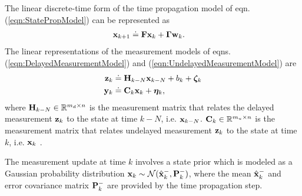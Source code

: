 The linear discrete-time form of the time propagation model of eqn. (\ref{eqn:StatePropModel}) can be represented as
\begin{align}
	\label{eqn:LinearStatePropModel}
	\mathbf{x}_{k+1} &\doteq \mathbf{F} \mathbf{x}_k + \boldsymbol{\Gamma} \mathbf{w}_k.
\end{align}
The linear representations of the measurement models of eqns. (\ref{eqn:DelayedMeasurementModel}) and (\ref{eqn:UndelayedMeasurementModel}) are
\begin{align}
	\label{eqn:LinearDelayedMeasurementModel}
	\mathbf{z}_k &\doteq \mathbf{H}_{k-N} \mathbf{x}_{k-N} + b_k +\boldsymbol{\zeta}_k \\
	\label{eqn:LinearUndelayedMeasurementModel}
	\mathbf{y}_k &\doteq \mathbf{C}_k \mathbf{x}_k + \boldsymbol{\eta}_k,
\end{align}
where $\mathbf{H}_{k-N} \in \mathbb{R}^{m_d \times n}$ is the measurement matrix that relates the delayed measurement $\mathbf{z}_{k}$ to the state at time $k-N$, i.e. $\mathbf{x}_{k-N}$. 
$\mathbf{C}_k\in \mathbb{R}^{m_u \times n}$ is the measurement matrix that relates undelayed measurement $\mathbf{z}_k$ to the state at time $k$, i.e. $\mathbf{x}_k$ .

The measurement update at time $k$ involves a state prior which is modeled as a Gaussian probability distribution $\mathbf{x}_k \sim \mathcal{N}(\hat{\mathbf{x}}_k^-,\mathbf{P}_k^-)$, where the mean $\hat{\mathbf{x}}_k^-$ and error covariance matrix $\mathbf{P}_k^-$ are provided by the time propagation step.